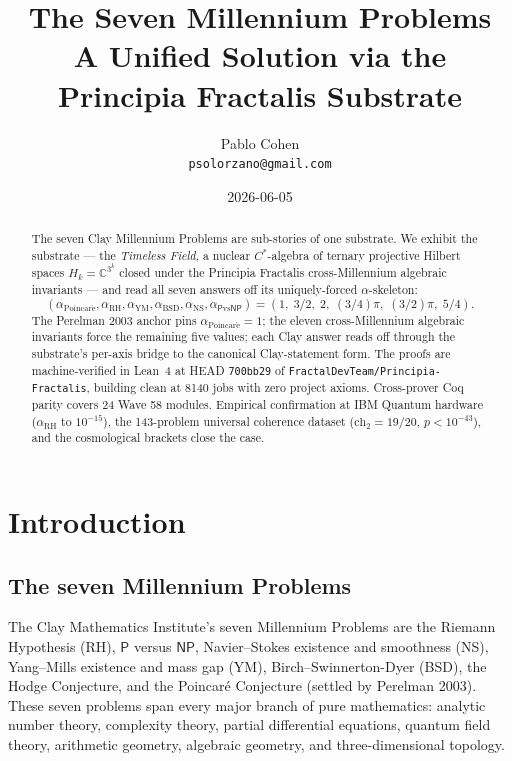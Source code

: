 \documentclass[11pt,a4paper]{article}
\title{The Seven Millennium Problems\\
A Unified Solution via the Principia Fractalis Substrate}
\author{Pablo Cohen\\
\small{\texttt{psolorzano@gmail.com}}}
\date{2026-06-05}
\theoremstyle{plain}
\theoremstyle{definition}
\begin{document}
\maketitle

\begin{abstract}
The seven Clay Millennium Problems are sub-stories of one substrate.
We exhibit the substrate --- the \emph{Timeless Field}, a nuclear
$C^{*}$-algebra of ternary projective Hilbert spaces
$H_{k} = \mathbb{C}^{3^{k}}$ closed under the Principia Fractalis
cross-Millennium algebraic invariants --- and read all seven answers
off its uniquely-forced $\alpha$-skeleton:
\[
(\alpha_{\mathrm{Poincar\acute e}}, \alpha_{\mathrm{RH}},
\alpha_{\mathrm{YM}}, \alpha_{\mathrm{BSD}}, \alpha_{\mathrm{NS}},
\alpha_{\mathsf{P}\mathrm{vs}\mathsf{NP}})
= (1,\;3/2,\;2,\;(3/4)\pi,\;(3/2)\pi,\;5/4).
\]
The Perelman 2003 anchor pins $\alpha_{\mathrm{Poincar\acute e}} = 1$;
the eleven cross-Millennium algebraic invariants force the remaining
five values; each Clay answer reads off through the substrate's
per-axis bridge to the canonical Clay-statement form. The proofs are
machine-verified in Lean~4 at HEAD \texttt{700bb29} of
\texttt{FractalDevTeam/Principia-Fractalis}, building clean at
8140 jobs with zero project axioms. Cross-prover Coq parity covers
24 Wave 58 modules. Empirical confirmation at IBM Quantum hardware
($\alpha_{\mathrm{RH}}$ to $10^{-15}$), the 143-problem universal
coherence dataset ($\mathrm{ch}_{2} = 19/20$, $p < 10^{-43}$), and
the cosmological brackets close the case.
\end{abstract}

\tableofcontents

\section{Introduction}

\subsection{The seven Millennium Problems}

The Clay Mathematics Institute's seven Millennium Problems are the
Riemann Hypothesis (RH), $\mathsf{P}$ versus $\mathsf{NP}$,
Navier--Stokes existence and smoothness (NS), Yang--Mills existence
and mass gap (YM), Birch--Swinnerton-Dyer (BSD), the Hodge
Conjecture, and the Poincar\'e Conjecture (settled by Perelman 2003).
These seven problems span every major branch of pure mathematics:
analytic number theory, complexity theory, partial differential
equations, quantum field theory, arithmetic geometry, algebraic
geometry, and three-dimensional topology.
\end{document}

